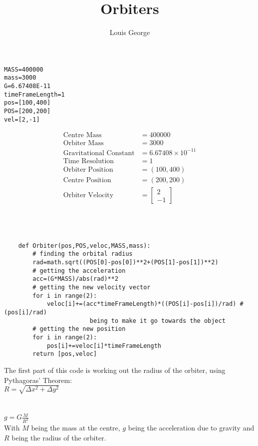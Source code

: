 \documentclass{article}
\title{Orbiters}
\author{Louis George}
\begin{document}
\maketitle
\text{}

\begin{verbatim}
MASS=400000
mass=3000
G=6.67408E-11
timeFrameLength=1
pos=[100,400]
POS=[200,200]
vel=[2,-1]
\end{verbatim}
\begin{align*}
\text{Centre Mass} &=400000 \\
\text{Orbiter Mass} &=3000 \\
\text{Gravitational Constant} &= 6.67408\times10^{-11}\\
\text{Time Resolution} &= 1\\
\text{Orbiter Position} &=(100,400) \\
\text{Centre Position} &=(200,200) \\
\text{Orbiter Velocity} &= \begin{bmatrix} 2 \\ -1 \end{bmatrix}
\end{align*}\\\\
\\
\begin{verbatim}
    def Orbiter(pos,POS,veloc,MASS,mass):
        # finding the orbital radius
        rad=math.sqrt((POS[0]-pos[0])**2+(POS[1]-pos[1])**2)
        # getting the acceleration
        acc=(G*MASS)/abs(rad)**2
        # getting the new velocity vector
        for i in range(2):
            veloc[i]+=(acc*timeFrameLength)*((POS[i]-pos[i])/rad) #(pos[i]/rad) 
                        being to make it go towards the object
        # getting the new position
        for i in range(2):
            pos[i]+=veloc[i]*timeFrameLength
        return [pos,veloc]
\end{verbatim}
The first part of this code is working out the radius of the orbiter, using Pythagoras' Theorem:
\\$R=\sqrt{\Delta x ^2 + \Delta y ^2}$
\\\\
\\$g=G\frac{M}{R^2}$
\\With $M$ being the mass at the centre, $g$ being the acceleration due to gravity and $R$ being the radius of the orbiter.
\end{document}
